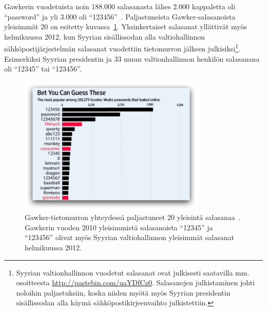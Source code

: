 \documentclass[finnish,gradu]{tktltiki}
\begin{document}
   Gawkerin vuodetuista noin 188.000 salasanasta lähes 2.000 kappaletta oli ``password'' ja yli 3.000 oli  ``123456''~\cite{forbes_gawker_12_2010}. Paljastuneista Gawker-salasanoista yleisimmät 20 on esitetty kuvassa~\ref{fig:gawker_top20_passwords}. Yksinkertaiset salasanat yllättivät myös helmikuussa 2012, kun Syyrian sisällissodan alla valtiohallinnon sähköpostijärjestelmän salasanat vuodettiin tietomurron jälkeen julkisiksi\footnote{Syyrian valtionhallinnon vuodetut salasanat ovat julkisesti saatavilla mm. osoitteesta \url{http://pastebin.com/uaYDfCz0}. Salasanojen julkistaminen johti noloihin paljastuksiin, koska niiden myötä myös Syyrian presidentin sisällissodan alla käymä sähköpostikirjeenvaihto julkistettiin.}. Esimerkiksi Syyrian presidentin ja 33 muun valtionhallinnon henkilön salasanana oli ``12345'' tai ``123456''.

  \begin{figure}
    \centering
    \includegraphics[width=0.8\textwidth]{images/gawker_top20_passwords.jpg}
    \caption{Gawker-tietomurron yhteydessä paljastuneet 20 yleisintä salasanaa~\cite{wsj_gawker_12_2010}. Gawkerin vuoden 2010 yleisimmistä salasanoista ``12345'' ja ``123456'' olivat myös Syyrian valtiohallinnon yleisimmät salasanat helmikuussa 2012.}
    \label{fig:gawker_top20_passwords}
  \end{figure}
\end{document}
